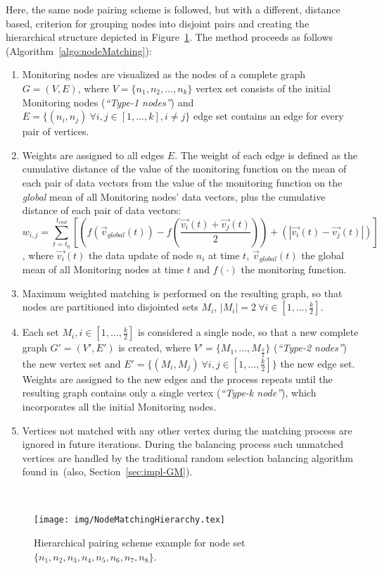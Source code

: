 Here, the same node pairing scheme is followed, but with a different, distance based, criterion for grouping nodes into disjoint pairs and creating the hierarchical structure depicted in Figure~\ref{fig:nodePairHierarchy}. The method proceeds as follows (Algorithm~\ref{algo:nodeMatching}):
\begin{enumerate}
\item Monitoring nodes are visualized as the nodes of a complete graph $G=(V,E)$, where $V=\{n_1, n_2, ... , n_k\}$ vertex set consists of the initial Monitoring nodes (\emph{``Type-1 nodes''}) and $E=\{(n_i, n_j)\ \forall i,j \in [1, ..., k], i \neq j\}$ edge set contains an edge for every pair of vertices.
\item Weights are assigned to all edges $E$. The weight of each edge is defined as the cumulative distance of the value of the monitoring function on the mean of each pair of data vectors from the value of the monitoring function on the \emph{global} mean of all Monitoring nodes' data vectors, plus the cumulative distance of each pair of data vectors:
\begin{equation}
w_{i,j}=
\sum_{t=t_0}^{t_{end}}{[(f(\vec{v}_{global}(t))-f(\frac{\vec{v_i}(t)+\vec{v_j}(t)}{2}))+(|\vec{v_i}(t)-\vec{v_j}(t)|)]}
\label{form:distanceMatchingWeights}
\end{equation}
, where $\vec{v_i}(t)$ the data update of node $n_i$ at time $t$, $\vec{v}_{global}(t)$ the global mean of all Monitoring nodes at time $t$ and $f(\cdot)$ the monitoring function.

\item Maximum weighted matching is performed on the resulting graph, so that nodes are partitioned into disjointed sets $M_i$, $|M_i|=2\ \forall i \in [1, ..., \frac{k}{2}]$. 

\item Each set $M_i, i \in [1, ..., \frac{k}{2}]$ is considered a single node, so that a new complete graph $G'=(V', E')$ is created, where $V'=\{M_1, ..., M_{\frac{k}{2}}\}$ (\emph{``Type-2 nodes''}) the new vertex set and $E'=\{(M_i, M_j)\ \forall i,j \in [1, ..., \frac{k}{2}]\}$ the new edge set. Weights are assigned to the new edges and the process repeats until the resulting graph contains only a single vertex (\emph{``Type-k node''}), which incorporates all the initial Monitoring nodes.

\item Vertices not matched with any other vertex during the matching process are ignored in future iterations. During the balancing process such unmatched vertices are handled by the traditional random selection balancing algorithm found in~\cite{Sharfman2006GM}(also, Section~\ref{sec:impl-GM}). 
\end{enumerate} 
~
\begin{figure}
\centering
\texttt{[image: img/NodeMatchingHierarchy.tex]}
\caption{Hierarchical pairing scheme example  for node set $\{n_1, n_2, n_3, n_4, n_5, n_6, n_7, n_8\}$.} 
\label{fig:nodePairHierarchy}
\end{figure}

